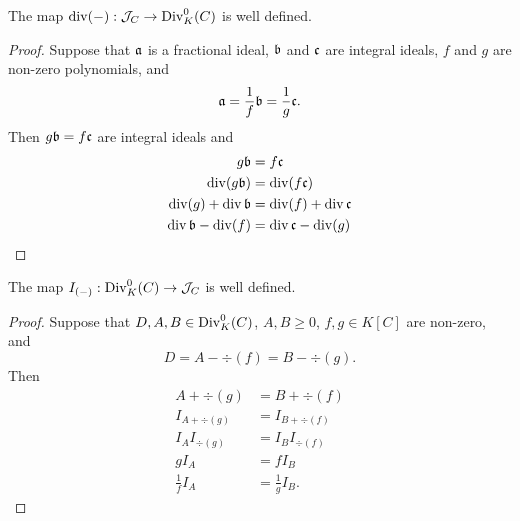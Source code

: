 \begin{proposition}
  The map $\div(-) : \cal J_C \to \Div_K^0(C)$ is well defined.
\end{proposition}
\begin{proof}
  Suppose that $\frak a$ is a fractional ideal,
  $\frak b$ and $\frak c$ are integral ideals,
  $f$ and $g$ are non-zero polynomials, and
    \[ \frak a = \frac 1 f \frak b = \frac 1 g \frak c. \]
  Then $g \frak b = f \frak c$ are integral ideals and
  \begin{align*}
    g \frak b &= f \frak c \\
    \div(g \frak b) &= \div(f \frak c) \\
    \div(g) + \div \frak b &= \div(f) + \div \frak c \\
    \div \frak b - \div(f) &= \div \frak c - \div(g)
  \end{align*}
\end{proof}

\begin{proposition}
  The map $I_{(-)} : \Div_K^0(C) \to \cal J_C$ is well defined.
\end{proposition}
\begin{proof}
  Suppose that $D, A, B \in \Div_K^0(C)$, $A, B \geq 0$,
  $f, g \in K[C]$ are non-zero, and
    \[ D = A - \div(f) = B - \div(g). \]
  Then
  \begin{align*}
    A + \div(g) &= B + \div(f) \\
    I_{A + \div(g)} &= I_{B + \div(f)} \\
    I_A I_{\div(g)} &= I_B I_{\div(f)} \\
    g I_A &= f I_B \\
    \frac 1 f I_A &= \frac 1 g I_B.
  \end{align*}
\end{proof}

